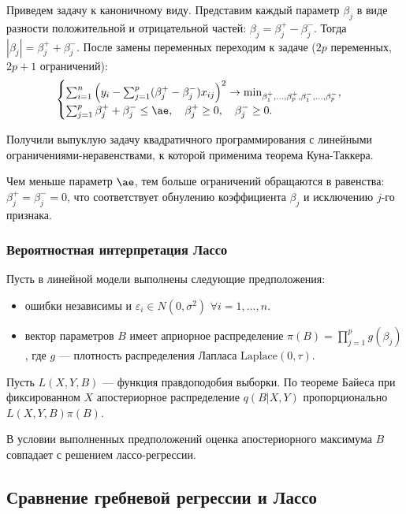 \documentclass[11pt,colorlinks=true]{article}
\begin{document}
Приведем задачу к каноничному виду. Представим каждый параметр $\beta_{j}$ в виде разности положительной и отрицательной частей: $\beta_{j}=\beta_{j}^{+}-\beta_{j}^{-}$. Тогда $|\beta_{j}|=\beta_{j}^{+}+\beta_{j}^{-}$. После замены переменных переходим к задаче 
($2p$ переменных, $2p+1$ ограничений):
\begin{equation*}
\begin{cases}
\sum_{i=1}^{n}
\left(
y_{i}
-
\sum_{j=1}^{p}(\beta_{j}^{+}-\beta_{j}^{-})x_{ij}
\right)^{2}
\to
\min_{\beta_{1}^{+},\ldots,\beta_{p}^{+},\beta_{1}^{-},\ldots,\beta_{p}^{-}},\\
\sum_{j=1}^{p}\beta_{j}^{+}+\beta_{j}^{-}\leq\ae,
\quad
\beta_{j}^{+}\geq 0,
\quad
\beta_{j}^{-}\geq 0.
\end{cases}
\end{equation*}

Получили выпуклую задачу квадратичного программирования с линейными ограничениями-неравенствами, к которой применима теорема Куна-Таккера.

Чем меньше параметр $\ae$, тем больше ограничений обращаются в равенства: $\beta_{j}^{+}=\beta_{j}^{-}=0$, что соответствует обнулению коэффициента $\beta_{j}$ и исключению $j$-го признака.

\subsubsection{Вероятностная интерпретация Лассо}

Пусть в линейной модели выполнены следующие предположения:
\begin{itemize}
\item ошибки независимы и $\varepsilon_{i}\in N(0,\sigma^{2})$ $\forall i=1,\ldots,n$.
\item вектор параметров $B$ имеет априорное распределение $\pi(B)=\prod_{j=1}^{p}g(\beta_{j})$, где $g$ --- плотность распределения Лапласа $\mathrm{Laplace}(0,\tau)$.
\end{itemize}

 Пусть $L(X,Y,B)$ --- функция правдоподобия выборки. %
 По теореме Байеса при фиксированном $X$ апостериорное распределение $q(B|X,Y)$ пропорционально $L(X,Y,B)\pi(B)$.

В условии выполненных предположений оценка апостериорного максимума $B$ совпадает с решением лассо-регрессии.

\subsection{Сравнение гребневой регрессии и Лассо}
\end{document}
